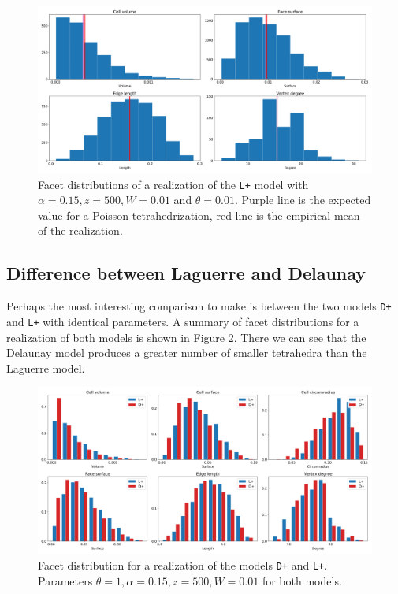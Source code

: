 \begin{figure}
  \centering
    \includegraphics[width=1\textwidth]{../img/numeric/poisson-1.png}
  \caption{Facet distributions of a realization of the \texttt{L+} model with $\alpha=0.15,z=500,W=0.01$ and $\theta = 0.01$. Purple line is the expected value for a Poisson-tetrahedrization, red line is the empirical mean of the realization.  }
  \label{fig:PoisvsGibbs}
\end{figure}




\subsection{Difference between Laguerre and Delaunay}
Perhaps the most interesting comparison to make is between the two models \texttt{D+} and \texttt{L+} with identical parameters. A summary of facet distributions for a realization of both models is shown in Figure  \ref{fig:DelvsLag}. There we can see that the Delaunay model produces a greater number of smaller tetrahedra than the Laguerre model. 


\begin{figure}
  \centering
    \includegraphics[width=1\textwidth]{../img/numeric/facets_L+_D+-1.png}
  \caption{Facet distribution for a realization of the models \texttt{D+} and \texttt{L+}. Parameters $\theta = 1,\alpha = 0.15, z=500, W=0.01$ for both models.}
  \label{fig:DelvsLag}
\end{figure}


